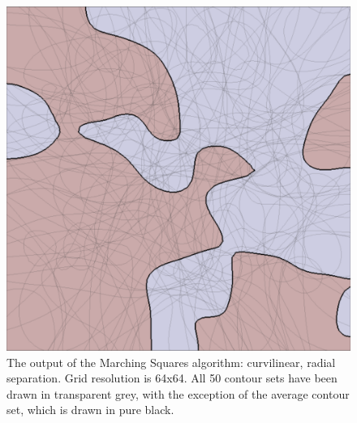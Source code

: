 \documentclass[12pt]{article}
\begin{document}
\begin{figure} 
\centering
  \includegraphics[width = 3 in]{10blur.png}
  \caption{The output of the Marching Squares algorithm: curvilinear, radial separation. 
Grid resolution is 64x64.
All 50 contour sets have been drawn in transparent grey, with the exception of the average contour set, which is drawn in pure black.
}
\end{figure}
\end{document}
